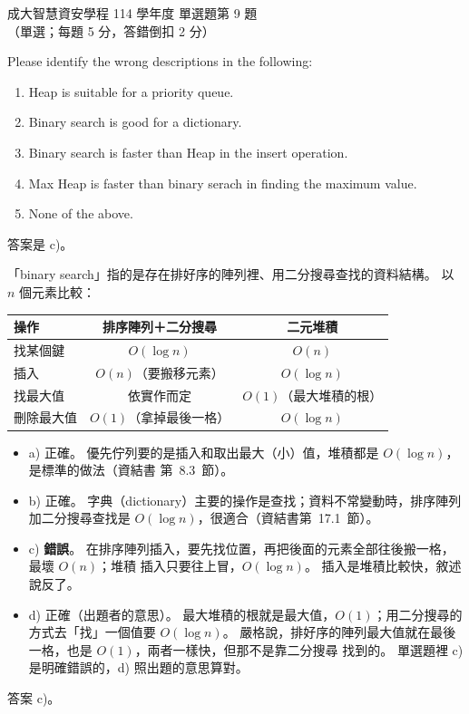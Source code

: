 \begin{pastexam}[label={px:ncku-114-isec-ds-09}]{成大智慧資安學程 114 學年度 單選題第 9 題}
（單選；每題 5 分，答錯倒扣 2 分）

Please identify the wrong descriptions in the following:
\begin{enumerate}[label=\alph*)]
\item Heap is suitable for a priority queue.
\item Binary search is good for a dictionary.
\item Binary search is faster than Heap in the insert operation.
\item Max Heap is faster than binary serach in finding the maximum value.
\item None of the above.
\end{enumerate}
\end{pastexam}

\begin{pastsoln}
答案是 c)。

「binary search」指的是存在排好序的陣列裡、用二分搜尋查找的資料結構。 以 $n$ 個元素比較：
\begin{center}
\small
\begin{tabular}{lcc}
\toprule
操作 & 排序陣列＋二分搜尋 & 二元堆積 \\
\midrule
找某個鍵 & $O(\log n)$ & $O(n)$ \\
插入 & $O(n)$（要搬移元素） & $O(\log n)$ \\
找最大值 & 依實作而定 & $O(1)$（最大堆積的根） \\
刪除最大值 & $O(1)$（拿掉最後一格） & $O(\log n)$ \\
\bottomrule
\end{tabular}
\end{center}
\begin{itemize}
\item a) 正確。 優先佇列要的是插入和取出最大（小）值，堆積都是 $O(\log n)$，是標準的做法（資結書
第~8.3~節）。
\item b) 正確。 字典（dictionary）主要的操作是查找；資料不常變動時，排序陣列加二分搜尋查找是
$O(\log n)$，很適合（資結書第~17.1~節）。
\item c) \textbf{錯誤}。 在排序陣列插入，要先找位置，再把後面的元素全部往後搬一格，最壞 $O(n)$；堆積
插入只要往上冒，$O(\log n)$。 插入是堆積比較快，敘述說反了。
\item d) 正確（出題者的意思）。 最大堆積的根就是最大值，$O(1)$；用二分搜尋的方式去「找」一個值要
$O(\log n)$。 嚴格說，排好序的陣列最大值就在最後一格，也是 $O(1)$，兩者一樣快，但那不是靠二分搜尋
找到的。 單選題裡 c) 是明確錯誤的，d) 照出題的意思算對。
\end{itemize}
答案 c)。
\end{pastsoln}
